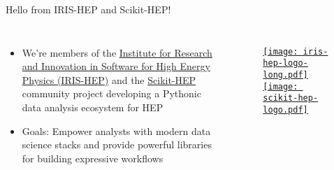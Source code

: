 \begin{frame}{Hello from IRIS-HEP and Scikit-HEP!}
  \begin{columns}
    \Large
    \begin{itemize}\setlength{\itemsep}{0.5 cm}
      \item We're members of the \href{https://iris-hep.org/}{Institute for Research and Innovation in Software for High Energy Physics (IRIS-HEP)} and the \href{https://scikit-hep.org/}{Scikit-HEP} community project developing a Pythonic data analysis ecosystem for HEP
      \item Goals: Empower analysts with modern data science stacks and provide powerful libraries for building expressive workflows
    \end{itemize}
%
    \begin{figure}
        \begin{center}
            \href{https://iris-hep.org/}{\texttt{[image: iris-hep-logo-long.pdf]}}
            \href{https://scikit-hep.org/}{\texttt{[image: scikit-hep-logo.pdf]}}
        \end{center}
    \end{figure}
  \end{columns}
\end{frame}

